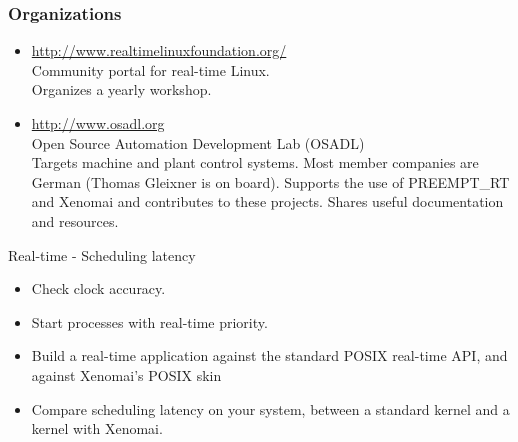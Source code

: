 \begin{frame}
  \frametitle{Organizations}
  \begin{itemize}
  \item \url{http://www.realtimelinuxfoundation.org/}\\
    Community portal for real-time Linux.\\
    Organizes a yearly workshop.
  \item \url{http://www.osadl.org}\\
    Open Source Automation Development Lab (OSADL)\\
    Targets machine and plant control systems. Most member companies
    are German (Thomas Gleixner is on board). Supports the use of
    PREEMPT\_RT and Xenomai and contributes to these projects. Shares
    useful documentation and resources.
  \end{itemize}
\end{frame}

\setuplabframe
{Real-time - Scheduling latency}
{
  \begin{itemize}
  \item Check clock accuracy.
  \item Start processes with real-time priority.
  \item Build a real-time application against the standard POSIX
        real-time API, and against Xenomai’s POSIX skin
  \item Compare scheduling latency on your system, between a standard
        kernel and a kernel with Xenomai.
  \end{itemize}
}


